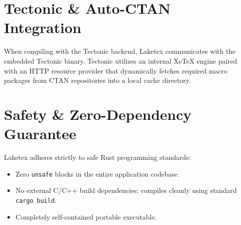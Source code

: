 \documentclass[11pt, a4paper]{article}
\begin{document}
\section{Tectonic \& Auto-CTAN Integration}

When compiling with the Tectonic backend, Laketex communicates with the embedded Tectonic binary. Tectonic utilizes an internal XeTeX engine paired with an HTTP resource provider that dynamically fetches required macro packages from CTAN repositories into a local cache directory.

\section{Safety \& Zero-Dependency Guarantee}

Laketex adheres strictly to safe Rust programming standards:
\begin{itemize}
    \item Zero \texttt{unsafe} blocks in the entire application codebase.
    \item No external C/C++ build dependencies; compiles cleanly using standard \texttt{cargo build}.
    \item Completely self-contained portable executable.
\end{itemize}
\end{document}
